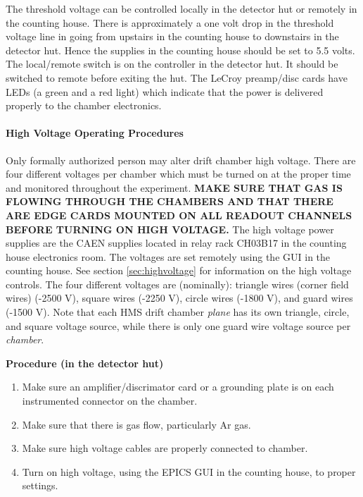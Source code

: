 {The threshold voltage
can be controlled locally in the detector hut or remotely in the
counting house. There is approximately a one volt drop in the threshold
voltage line in going from upstairs in the counting house to
downstairs in the detector hut.  Hence the supplies in the counting
house should be set to 5.5 volts. The local/remote switch is on the
controller in the
detector hut.  It should be switched to remote before exiting the hut.  The
LeCroy preamp/disc cards have LEDs (a green and a red light) which indicate
that the power is delivered properly to the chamber electronics.

\paragraph{High Voltage Operating Procedures}

Only formally authorized person may alter drift chamber high voltage.
There are four different voltages per chamber which must be turned on at the
proper time and monitored throughout the experiment.  {\bf MAKE SURE THAT
GAS IS FLOWING THROUGH THE CHAMBERS AND THAT THERE ARE
EDGE
CARDS MOUNTED
ON ALL READOUT CHANNELS BEFORE TURNING ON HIGH VOLTAGE.}
The high voltage
power supplies are the CAEN supplies located in relay rack CH03B17 in
the counting house electronics room.  The
voltages are set remotely using the GUI in the counting
house. See section \ref{sec:highvoltage} for information on
the high voltage controls.
The four different voltages are (nominally): triangle
wires (corner field wires) (-2500 V),
square wires (-2250 V), circle wires (-1800 V), and guard wires (-1500 V).
Note that each HMS drift chamber {\em plane} has its own triangle, circle,
and square voltage source, while there is only one guard wire voltage
source per {\em chamber}.
\begin{center}
{\bf Procedure (in the detector hut)}
\end{center}

\begin{enumerate}
\item {Make sure an amplifier/discrimator card or a grounding plate is on each instrumented
connector on the chamber.}
\item {Make sure that there is gas flow, particularly Ar gas.}
\item {Make sure high voltage cables are properly connected to
chamber.}
\item {Turn on high voltage, using the EPICS GUI in the counting house,
to proper settings.}
\end{enumerate}

}
